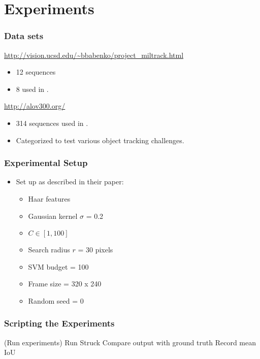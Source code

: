 \section{Experiments}

\begin{frame}
    \frametitle{Data sets}
    \url{http://vision.ucsd.edu/~bbabenko/project_miltrack.html}
    \begin{itemize}
        \item 12 sequences
        \item 8 used in \cite{6126251}.
    \end{itemize}
    \url{http://alov300.org/}
    \begin{itemize}
        \item 314 sequences used in \cite{6671560}.
        \item Categorized to test various object tracking challenges.
    \end{itemize}
\end{frame}

\begin{frame}
    \frametitle{Experimental Setup}
    \begin{itemize}
        \item Set up as described in their paper:
            \begin{itemize}
                \item Haar features
                \item Gaussian kernel \(\sigma\) = 0.2
                \item \(C \in [1, 100]\)
                \item Search radius \(r\) = 30 pixels
                \item SVM budget = 100
                \item Frame size = 320 x 240
                \item Random seed = 0
            \end{itemize}
    \end{itemize}
\end{frame}

\begin{frame}
    \frametitle{Scripting the Experiments}
    \begin{algorithm}[H]
        \DontPrintSemicolon
        \Begin(Run experiments)
        {
            {
                {
                    Run Struck\;
                    Compare output with ground truth\;
                    Record mean IoU\;
                }
            }
        }
    \end{algorithm}
\end{frame}

